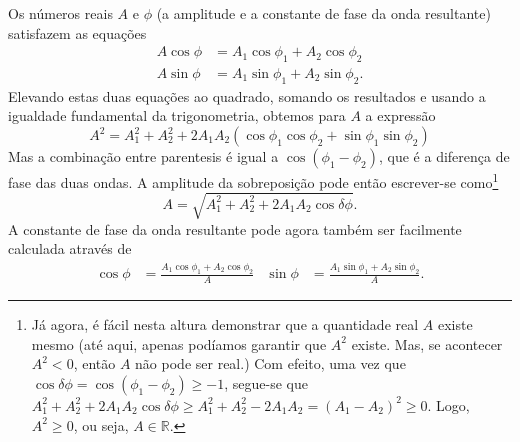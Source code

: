 Os números reais $A$ e $\phi$ (a amplitude e a constante de fase da onda
resultante) satisfazem as equações
\begin{align*}
A\cos\phi&=A_1\cos\phi_1+A_2\cos\phi_2\\
A\sin\phi&=A_1\sin\phi_1+A_2\sin\phi_2.
\end{align*}
Elevando estas duas equações ao quadrado, somando os resultados e usando a
igualdade fundamental da trigonometria, obtemos para $A$ a expressão
\begin{equation*}
A^2=A_1^2 + A_2^2 + 2A_1A_2(\cos\phi_1\cos\phi_2+\sin\phi_1\sin\phi_2)
\end{equation*}
Mas a combinação entre parentesis é igual a $\cos(\phi_1-\phi_2)$, que é a
diferença de fase das duas ondas. A amplitude da sobreposição pode então
escrever-se como\footnote{Já agora, é fácil nesta altura demonstrar que a
quantidade real $A$ existe mesmo (até aqui, apenas podíamos garantir que $A^2$
existe. Mas, se acontecer $A^2<0$, então $A$ não pode ser
real.) Com efeito, uma vez que $\cos\delta\phi=\cos(\phi_1-\phi_2)\geq-1$,
segue-se que $A_1^2+A_2^2+2A_1A_2\cos\delta\phi\geq
A_1^2+A_2^2-2A_1A_2=(A_1-A_2)^2\geq 0$. Logo, $A^2\geq0$, ou seja, $A\in
\mathbb{R}$.}
\begin{equation*}
A=\sqrt{A_1^2+A_2^2+2A_1A_2\cos\delta\phi}.
\end{equation*}
%
A constante de fase da onda resultante pode agora também ser facilmente
calculada através de
\begin{align*}
\cos\phi&=\frac{A_1\cos\phi_1+A_2\cos\phi_2}{A}&
\sin\phi&=\frac{A_1\sin\phi_1+A_2\sin\phi_2}{A}.
\end{align*}

